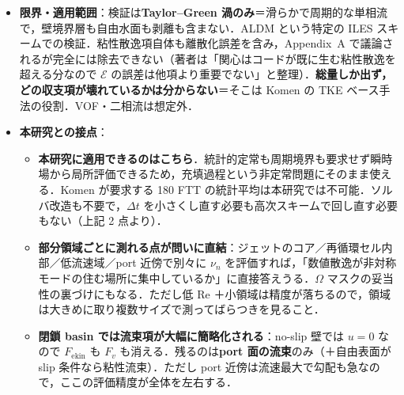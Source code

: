 \documentclass[11pt]{jsarticle}
\begin{document}
\begin{itemize}
\begin{itemize}
    \item \textbf{セル面再構成の次数も効かない}：2 次/4 次/6 次の差は最大 2.8~\%（それも $t \in [8, 9.5]$ の短期間のみ，大半の時間は同一）．理由は\textbf{手法自体が保存的だから，セル間流束の評価方法は問題にならない}．
    \item 任意の非周期部分領域で機能（CSD1--3, NCSD1--2 で検証）．ただし\textbf{小さい部分領域かつ低 Re では食い違いが目立つ}．同じ体積 $6^3$ セルでも $\epsilon_n$ が大きい CSD2 の方が一致が良く，数値散逸が小さい領域ほど相対誤差が大きい．
    \item \textbf{局所的には数値散逸が負にもなる}（Fig.~6 が $\mathrm{sgn}(\nu)$ で色分けした 3 次元可視化）．残差を数値散逸と解釈できるのは\textbf{十分大きい制御体積で散逸的寄与が分散的寄与を上回る}ときのみ（Komen も同じ論理を引用）．
    \item 完全周期領域では流束項が厳密に相殺し，全数値散逸は全運動エネルギーの変化率と全粘性散逸だけで決まる（式 61）．
  \end{itemize}
  \item \textbf{限界・適用範囲}：検証は\textbf{Taylor--Green 渦のみ}＝滑らかで周期的な単相流で，壁境界層も自由水面も剥離も含まない．ALDM という特定の ILES スキームでの検証．粘性散逸項自体も離散化誤差を含み，Appendix~A で議論されるが完全には除去できない（著者は「関心はコードが既に生む粘性散逸を超える分なので $\mathcal{E}$ の誤差は他項より重要でない」と整理）．\textbf{総量しか出ず，どの収支項が壊れているかは分からない}＝そこは Komen の TKE ベース手法の役割．VOF・二相流は想定外．
  \item \textbf{本研究との接点}：
  \begin{itemize}
    \item \textbf{本研究に適用できるのはこちら}．統計的定常も周期境界も要求せず瞬時場から局所評価できるため，充填過程という非定常問題にそのまま使える．Komen が要求する 180 FTT の統計平均は本研究では不可能．ソルバ改造も不要で，$\Delta t$ を小さくし直す必要も高次スキームで回し直す必要もない（上記 2 点より）．
    \item \textbf{部分領域ごとに測れる点が問いに直結}：ジェットのコア／再循環セル内部／低流速域／port 近傍で別々に $\nu_n$ を評価すれば，「数値散逸が非対称モードの住む場所に集中しているか」に直接答えうる．$\Omega$ マスクの妥当性の裏づけにもなる．ただし低 Re ＋小領域は精度が落ちるので，領域は大きめに取り複数サイズで測ってばらつきを見ること．
    \item \textbf{閉鎖 basin では流束項が大幅に簡略化される}：no-slip 壁では $u = 0$ なので $F_\mathrm{ekin}$ も $F_v$ も消える．残るのは\textbf{port 面の流束}のみ（＋自由表面が slip 条件なら粘性流束）．ただし port 近傍は流速最大で勾配も急なので，ここの評価精度が全体を左右する．

\end{itemize}
\end{itemize}
\end{document}
